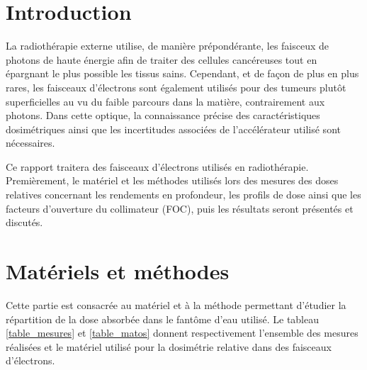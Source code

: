 \documentclass{article}
\begin{document}




\onehalfspacing

\pagestyle{fancy}
\renewcommand\headrulewidth{0.5pt}
\renewcommand\footrulewidth{0.5pt}
\fancyfoot[R]{\thepage}

\tableofcontents
\clearpage
\section{Introduction}

La radiothérapie externe utilise, de manière prépondérante, les faisceux de photons de haute énergie afin de traiter des cellules cancéreuses tout en épargnant le plus possible les tissus sains. Cependant, et de façon de plus en plus rares, les faisceaux d'électrons sont également utilisés pour des tumeurs plutôt superficielles au vu du faible parcours dans la matière, contrairement aux photons. Dans cette optique, la connaissance précise des caractéristiques dosimétriques ainsi que les incertitudes associées de l'accélérateur utilisé sont nécessaires. 

Ce rapport traitera des faisceaux d'électrons utilisés en radiothérapie. Premièrement, le matériel et les méthodes utilisés lors des mesures des doses relatives concernant les rendements en profondeur, les profils de dose ainsi que les facteurs d'ouverture du collimateur (FOC), puis les résultats seront présentés et discutés.

\section{Matériels et méthodes}

Cette partie est consacrée au matériel et à la méthode permettant d'étudier la répartition de la dose absorbée dans le fantôme d'eau utilisé. Le tableau \ref*{table_mesures} et \ref*{table_matos} donnent respectivement l'ensemble des mesures réalisées et le matériel utilisé pour la dosimétrie relative dans des faisceaux d'électrons.
\end{document}
